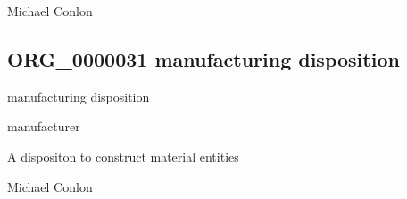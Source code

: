 \documentclass[letterpaper,10pt,english]{sphinxmanual}
\begin{document}
\begin{sphinxShadowBox}

\sphinxAtStartPar
Michael Conlon 
\end{sphinxShadowBox}
\begin{quote}

\ignorespaces \end{quote}


\subsection{ORG\_0000031 \sphinxhyphen{} manufacturing disposition}
\label{\detokenize{doc-ORG_0000031:org-0000031-manufacturing-disposition}}\label{\detokenize{doc-ORG_0000031:index-0}}\label{\detokenize{doc-ORG_0000031::doc}}
\begin{sphinxShadowBox}

\sphinxAtStartPar
manufacturing disposition
\end{sphinxShadowBox}

\begin{sphinxShadowBox}

\sphinxAtStartPar
manufacturer
\end{sphinxShadowBox}

\begin{sphinxShadowBox}

\sphinxAtStartPar
{\hyperref[\detokenize{doc-BFO_0000016::doc}]{}}
\end{sphinxShadowBox}

\begin{sphinxShadowBox}

\sphinxAtStartPar
A dispositon to construct material entities
\end{sphinxShadowBox}

\begin{sphinxShadowBox}

\sphinxAtStartPar
Michael Conlon 
\end{sphinxShadowBox}
\end{document}
